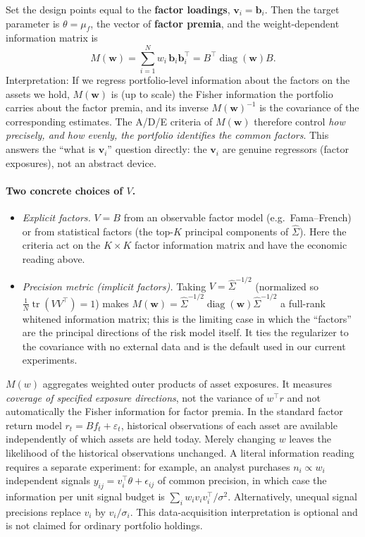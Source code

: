 \documentclass[11pt]{article}
\newcommand{\Sighat}{\hat\Sigma}
\newcommand{\tr}{\operatorname{tr}}
\newcommand{\diag}{\operatorname{diag}}
\newcommand{\w}{\mathbf{w}}
\newcommand{\vv}{\mathbf{v}}
\newcommand{\bb}{\mathbf{b}}
\newcommand{\M}{M(\w)}
\begin{document}
Set the design points equal to the \textbf{factor loadings}, $\vv_i=\bb_i$. Then
the target parameter is $\theta=\mu_f$, the vector of \textbf{factor premia}, and
the weight-dependent information matrix is
\begin{equation}
  \M=\sum_{i=1}^{N} w_i\,\bb_i\bb_i^\top=B^\top\diag(\w)B .
  \label{eq:factorinfo}
\end{equation}
Interpretation: If we regress portfolio-level information about the factors on
the assets we hold, $\M$ is (up to scale) the Fisher information the portfolio
carries about the factor premia, and its inverse $\M^{-1}$ is the covariance of
the corresponding estimates. The A/D/E criteria of $\M$ therefore control
\emph{how precisely, and how evenly, the portfolio identifies the common
factors}. This answers the ``what is $\vv_i$'' question directly: the $\vv_i$ are
genuine regressors (factor exposures), not an abstract device.

\paragraph{Two concrete choices of $V$.}
\begin{itemize}[leftmargin=1.4em,itemsep=0.2em]
  \item \emph{Explicit factors.} $V=B$ from an observable factor model
    (e.g.\ Fama--French) or from statistical factors (the top-$K$ principal
    components of $\Sighat$). Here the criteria act on the $K\times K$ factor
    information matrix and have the economic reading above.
  \item \emph{Precision metric (implicit factors).} Taking $V=\Sighat^{-1/2}$
    (normalized so $\tfrac1N\tr(VV^\top)=1$) makes $\M=\Sighat^{-1/2}\diag(\w)\Sighat^{-1/2}$
    a full-rank whitened information matrix; this is the limiting case in which the
    ``factors'' are the principal directions of the risk model itself. It ties the
    regularizer to the covariance with no external data and is the default used in
    our current experiments.
\end{itemize}

$M(w)$ aggregates weighted outer products of asset exposures. It measures \emph{coverage of specified exposure directions}, not the variance of $w^\top r$ and not automatically the Fisher information for factor premia. In the standard factor return model $r_t=Bf_t+\varepsilon_t$, historical observations of each asset are available independently of which assets are held today. Merely changing $w$ leaves the likelihood of the historical observations unchanged. A literal information reading requires a separate experiment: for example, an analyst purchases $n_i\propto w_i$ independent signals $y_{ij}=v_i^\top\theta+\epsilon_{ij}$ of common precision, in which case the information per unit signal budget is $\sum_iw_i v_iv_i^\top/\sigma^2$. Alternatively, unequal signal precisions replace $v_i$ by $v_i/\sigma_i$. This data-acquisition interpretation is optional and is not claimed for ordinary portfolio holdings.
\end{document}
